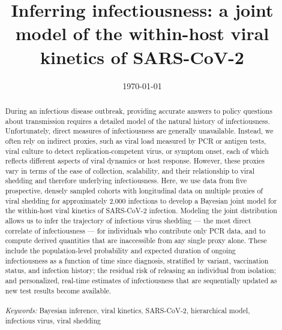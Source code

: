 \documentclass[12pt]{article}
\begin{document}
\begin{titlepage}
\title{Inferring infectiousness: a joint model of the within-host viral kinetics of SARS-CoV-2}
\author{ }

\date{\today}
\maketitle

\begin{abstract}
During an infectious disease outbreak, providing accurate answers to policy questions about transmission requires a detailed model of the natural history of infectiousness. Unfortunately, direct measures of infectiousness are generally unavailable. Instead, we often rely on indirect proxies, such as viral load measured by PCR or antigen tests, viral culture to detect replication-competent virus, or symptom onset, each of which reflects different aspects of viral dynamics or host response. However, these proxies vary in terms of the ease of collection, scalability, and their relationship to viral shedding and therefore underlying infectiousness. Here, we use data from five prospective, densely sampled cohorts with longitudinal data on multiple proxies of viral shedding for approximately 2,000 infections to develop a Bayesian joint model for the within-host viral kinetics of SARS-CoV-2 infection. Modeling the joint distribution allows us to infer the trajectory of infectious virus shedding — the most direct correlate of infectiousness — for individuals who contribute only PCR data, and to compute derived quantities that are inaccessible from any single proxy alone. These include the population-level probability and expected duration of ongoing infectiousness as a function of time since diagnosis, stratified by variant, vaccination status, and infection history; the residual risk of releasing an individual from isolation; and personalized, real-time estimates of infectiousness that are sequentially updated as new test results become available.
\noindent \\
\vspace{0in} \\
\noindent\textit{Keywords:} Bayesian inference, viral kinetics, SARS-CoV-2, hierarchical model, infectious virus, viral shedding
\bigskip
\end{abstract}
\setcounter{page}{0}
\thispagestyle{empty}
\end{titlepage}
\pagebreak \newpage
{} %
\end{document}
